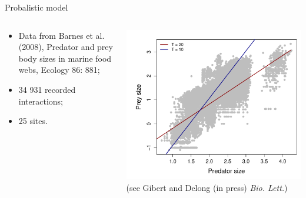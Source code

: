 \documentclass{eecslides}
\begin{document}
	\begin{frame}{Probalistic model}
 	    	\begin{columns}
			\begin{column}{0.4\textwidth}							
				\begin{itemize}
					\item Data from Barnes et al. (2008), Predator and prey body sizes in marine 						food webs, Ecology 86: 881;
					\item 34 931 recorded interactions;
					\item 25 sites.
				\end{itemize}
			\end{column}
			\begin{column}{0.6\textwidth}
				\begin{center}
					\includegraphics[height=0.6\textheight]{PredPreyTemp}\\
					\footnotesize{(see Gibert and Delong (in press) \textit{Bio. Lett.})}
				\end{center}
			\end{column}				
		\end{columns}	   
	\end{frame}

\end{document}
